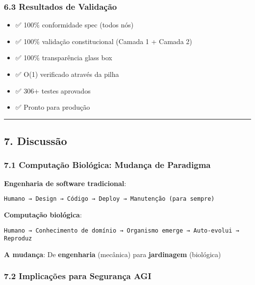 \documentclass[
]{article}
\providecommand{\tightlist}{%
  \setlength{\itemsep}{0pt}\setlength{\parskip}{0pt}}
\begin{document}
\subsubsection{6.3 Resultados de
Validação}\label{resultados-de-validauxe7uxe3o}

\begin{itemize}
\tightlist
\item
  ✅ 100\% conformidade spec (todos nós)
\item
  ✅ 100\% validação constitucional (Camada 1 + Camada 2)
\item
  ✅ 100\% transparência glass box
\item
  ✅ O(1) verificado através da pilha
\item
  ✅ 306+ testes aprovados
\item
  ✅ Pronto para produção
\end{itemize}

\begin{center}\rule{0.5\linewidth}{0.5pt}\end{center}

\subsection{7. Discussão}\label{discussuxe3o}

\subsubsection{7.1 Computação Biológica: Mudança de
Paradigma}\label{computauxe7uxe3o-bioluxf3gica-mudanuxe7a-de-paradigma}

\textbf{Engenharia de software tradicional}:

\begin{verbatim}
Humano → Design → Código → Deploy → Manutenção (para sempre)
\end{verbatim}

\textbf{Computação biológica}:

\begin{verbatim}
Humano → Conhecimento de domínio → Organismo emerge → Auto-evolui → Reproduz
\end{verbatim}

\textbf{A mudança}: De \textbf{engenharia} (mecânica) para
\textbf{jardinagem} (biológica)

\subsubsection{7.2 Implicações para Segurança
AGI}\label{implicauxe7uxf5es-para-seguranuxe7a-agi}
\end{document}
